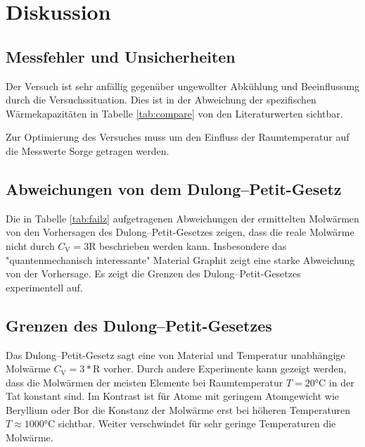 \section{Diskussion}
\label{sec:Diskussion}
\subsection{Messfehler und Unsicherheiten}
Der Versuch ist sehr anfällig gegenüber ungewollter Abkühlung und Beeinflussung durch die Versuchssituation.
Dies ist in der Abweichung der spezifischen Wärmekapazitäten in Tabelle \ref{tab:compare} von den Literaturwerten sichtbar.

Zur Optimierung des Versuches muss um den Einfluss der Raumtemperatur auf die Messwerte Sorge getragen werden.

\subsection{Abweichungen von dem Dulong--Petit-Gesetz}
Die in Tabelle \ref{tab:failz} aufgetragenen Abweichungen der ermittelten Molwärmen von den Vorhersagen des Dulong--Petit-Gesetzes zeigen, dass die reale Molwärme nicht durch $C_\text{V}=3\text{R}$ beschrieben werden kann. 
Insbesondere das "quantenmechanisch interessante" Material Graphit zeigt eine starke Abweichung von der Vorhersage.
Es zeigt die Grenzen des Dulong--Petit-Gesetzes experimentell auf.

\subsection{Grenzen des Dulong--Petit-Gesetzes}
Das Dulong--Petit-Gesetz sagt eine von Material und Temperatur unabhängige Molwärme $C_\text{V} =3*\text{R}$ vorher.
Durch andere Experimente kann gezeigt werden, dass
die Molwärmen der meisten Elemente bei Raumtemperatur $T=20\si{\celsius}$ in der Tat konstant sind.
Im Kontrast ist für Atome mit geringem Atomgewicht wie Beryllium oder Bor die Konstanz der Molwärme erst bei höheren Temperaturen $T\approx{1000\si{\celsius}}$ sichtbar. 
Weiter verschwindet für sehr geringe Temperaturen die Molwärme.

